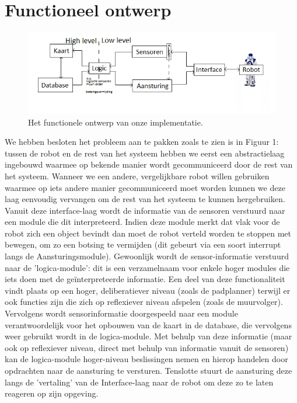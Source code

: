 \documentclass[a4paper, 11pt]{article}
\begin{document}
\clearpage
\section*{Functioneel ontwerp}
  \begin{figure}[h!]
    \centering
      \includegraphics[scale=0.7]{eenplaatjemetheelduidelijkeuitleg.png}
    \caption{Het functionele ontwerp van onze implementatie.}
  \end{figure}

  We hebben besloten het probleem aan te pakken zoals te zien is in Figuur 1: tussen de robot en de rest van het
  systeem hebben we eerst een abstractielaag ingebouwd waarmee op bekende manier wordt gecommuniceerd door de rest
  van het systeem. Wanneer we een andere, vergelijkbare robot willen gebruiken waarmee op iets andere manier 
  gecommuniceerd moet worden kunnen we deze laag eenvoudig vervangen om de rest van het systeem te kunnen
  hergebruiken. Vanuit deze interface-laag wordt de informatie van de sensoren verstuurd naar een module die dit
  interpreteerd. Indien deze module merkt dat vlak voor de robot zich een object bevindt dan moet de robot 
  verteld worden te stoppen met bewegen, om zo een botsing te vermijden (dit gebeurt via een soort interrupt langs
  de Aansturingsmodule). Gewoonlijk wordt de sensor-informatie verstuurd naar de 'logica-module': dit is een
  verzamelnaam voor enkele hoger modules die iets doen met de ge\"interpreteerde informatie. Een deel van deze
  functionaliteit vindt plaats op een hoger, deliberatiever niveau (zoals de padplanner) terwijl er ook functies zijn
  die zich op reflexiever niveau afspelen (zoals de muurvolger). Vervolgens wordt sensorinformatie doorgespeeld
  naar een module verantwoordelijk voor het opbouwen van de kaart in de database, die vervolgens weer gebruikt
  wordt in de logica-module. Met behulp van deze informatie (maar ook op reflexiever niveau, direct met behulp van 
  informatie vanuit de sensoren) kan de logica-module hoger-niveau beslissingen nemen en hierop handelen door
  opdrachten naar de aansturing te versturen. Tenslotte stuurt de aansturing deze langs de 'vertaling' van de 
  Interface-laag naar de robot om deze zo te laten reageren op zijn opgeving.
  
\end{document}
